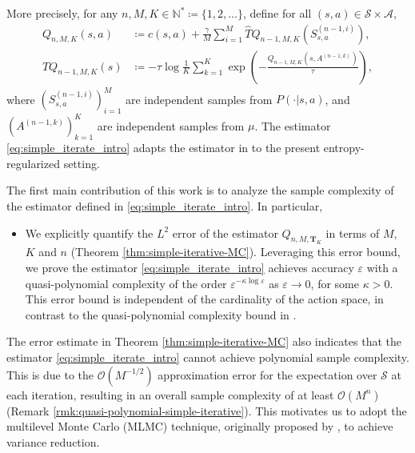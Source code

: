 \documentclass[11pt]{article}
\numberwithin{equation}{section}
\theoremstyle{definition}
\theoremstyle{remark}
\def\cA{\mathcal{A}}
\def\cS{\mathcal{S}}
\def\N{{\mathbb{N}}}
\newcommand{\citet}{\cite}
\begin{document}
 More precisely,
 for any  $n, M, K\in \N^* \coloneqq \{1,2,\ldots \}$, define 
 for all $(s,a)\in \cS\times \cA$,
\begin{equation}
\label{eq:simple_iterate_intro}
    \begin{aligned}
    {Q}_{n,M,K}(s,a) &\coloneqq  c(s,a) + \frac{\gamma}{M} \sum_{i = 1}^M \hat T  {Q}_{n-1,M, K}  \left(S_{s,a}^{(n-1, i)}\right),\\  
    \hat T  {Q}_{n-1,M, K}  (s) &  \coloneqq    -\tau \log \frac{1}{K}\sum_{k = 1}^{K} \exp \left(-\frac{Q_{n-1,M,K}\left(s,A^{(n-1,k)}\right) }{\tau}  \right),
    \end{aligned}
\end{equation}
where $(S ^{(n-1,i)}_{s,a}) _{i=1}^M$ are independent samples from  $P(\cdot | s, a)$, and $(A^{(n-1,k)})_{k=1}^K$
are independent samples from $\mu$.
The estimator \eqref{eq:simple_iterate_intro}
adapts the estimator in \citet{kearns2002sparse} to the present entropy-regularized setting. 

The first main contribution of this work is
to analyze the sample complexity of the estimator defined in \eqref{eq:simple_iterate_intro}. 
In particular,
\begin{itemize}
\item We explicitly quantify the $L^2$ error of the estimator
${Q}_{n,M,\mathbf T_K}$ 
  in terms of $M$, $K$ and $n$
(Theorem \ref{thm:simple-iterative-MC}).
    Leveraging this error bound, 
    we prove  the estimator
  \eqref{eq:simple_iterate_intro}
  achieves accuracy $\varepsilon$ with a quasi-polynomial complexity  of the order 
$\varepsilon^{ -\kappa \log \varepsilon  }$ as $\varepsilon\to 0$, for some $\kappa>0$. 
  This error bound is independent of the cardinality of the action space,
  in contrast to the quasi-polynomial complexity bound in \citet{kearns2002sparse}. 

 
\end{itemize}

 
 
The error estimate in Theorem \ref{thm:simple-iterative-MC} also indicates that the estimator \eqref{eq:simple_iterate_intro} cannot achieve polynomial sample complexity.
This is due to the $\mathcal O(M^{-1/2})$ approximation error for the expectation over $\cS$ at each iteration,
resulting in an overall sample complexity of at least
  $\mathcal O( M^{n})$
(Remark \ref{rmk:quasi-polynomial-simple-iterative}).
This motivates us to adopt the multilevel Monte Carlo (MLMC) technique, originally proposed by \citet{giles2015mlmc}, to achieve variance reduction.
\end{document}

